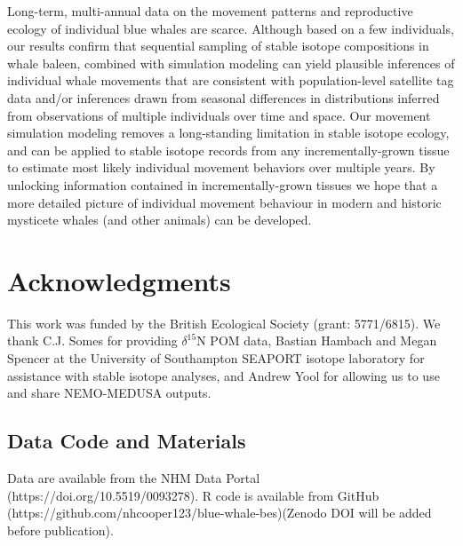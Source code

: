 \documentclass[a4paper,12pt]{article}
\begin{document}
Long-term, multi-annual data on the movement patterns and reproductive ecology of individual blue whales are scarce. 
Although based on a few individuals, our results confirm that sequential sampling of stable isotope compositions in whale baleen, combined with simulation modeling can yield plausible inferences of individual whale movements that are consistent with population-level satellite tag data and/or inferences drawn from seasonal differences in distributions inferred from observations of multiple individuals over time and space. 
Our movement simulation modeling removes a long-standing limitation in stable isotope ecology, and can be applied to stable isotope records from any incrementally-grown tissue to estimate most likely individual movement behaviors over multiple years. 
By unlocking information contained in incrementally-grown tissues we hope that a more detailed picture of individual movement behaviour in modern and historic mysticete whales (and other animals) can be developed.

\section{Acknowledgments}\label{acknowledgments}
This work was funded by the British Ecological Society (grant: 5771/6815). 
We thank C.J. Somes for providing  $\delta^{15}$N POM data, Bastian Hambach and Megan Spencer at the University of Southampton SEAPORT isotope laboratory for assistance with stable isotope analyses, and Andrew Yool for allowing us to use and share NEMO-MEDUSA outputs.


%


\subsection{Data Code and Materials}\label{data-code-and-materials}
Data are available from the NHM Data Portal (https://doi.org/10.5519/0093278). 
R code is available from GitHub (https://github.com/nhcooper123/blue-whale-bes)(Zenodo DOI will be added before publication).
\end{document}

